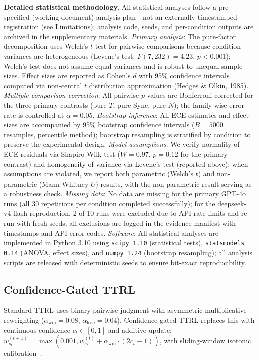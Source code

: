 \documentclass[11pt]{article}
\theoremstyle{definition}
\theoremstyle{remark}
\begin{document}
\textbf{Detailed statistical methodology.} All statistical analyses follow a pre-specified (working-document) analysis plan---not an externally timestamped registration (see Limitations); analysis code, seeds, and per-condition outputs are archived in the supplementary materials. \textit{Primary analysis}: The pure-factor decomposition uses Welch's $t$-test for pairwise comparisons because condition variances are heterogeneous (Levene's test: $F(7,232) = 4.23$, $p < 0.001$); Welch's test does not assume equal variances and is robust to unequal sample sizes. Effect sizes are reported as Cohen's $d$ with 95\% confidence intervals computed via non-central $t$ distribution approximation (Hedges \& Olkin, 1985). \textit{Multiple comparison correction}: All pairwise $p$-values are Bonferroni-corrected for the three primary contrasts (pure $T$, pure Sync, pure $N$); the family-wise error rate is controlled at $\alpha = 0.05$. \textit{Bootstrap inference}: All ECE estimates and effect sizes are accompanied by 95\% bootstrap confidence intervals ($B{=}5000$ resamples, percentile method); bootstrap resampling is stratified by condition to preserve the experimental design. \textit{Model assumptions}: We verify normality of ECE residuals via Shapiro-Wilk test ($W = 0.97$, $p = 0.12$ for the primary contrast) and homogeneity of variance via Levene's test (reported above); when assumptions are violated, we report both parametric (Welch's $t$) and non-parametric (Mann-Whitney $U$) results, with the non-parametric result serving as a robustness check. \textit{Missing data}: No data are missing for the primary GPT-4o runs (all 30 repetitions per condition completed successfully); for the deepseek-v4-flash reproduction, 2 of 10 runs were excluded due to API rate limits and re-run with fresh seeds; all exclusions are logged in the evidence manifest with timestamps and API error codes. \textit{Software}: All statistical analyses are implemented in Python 3.10 using \texttt{scipy 1.10} (statistical tests), \texttt{statsmodels 0.14} (ANOVA, effect sizes), and \texttt{numpy 1.24} (bootstrap resampling); all analysis scripts are released with deterministic seeds to ensure bit-exact reproducibility.

\subsection{Confidence-Gated TTRL}

Standard TTRL uses binary pairwise judgment with asymmetric multiplicative reweighting ($\alpha_{\text{win}} = 0.08$, $\alpha_{\text{lose}} = 0.04$). Confidence-gated TTRL replaces this with continuous confidence $c_t \in [0,1]$ and additive update: $w_{s_t}^{(t+1)} = \max(0.001, w_{s_t}^{(t)} + \alpha_{\text{win}} \cdot (2c_t - 1))$, with sliding-window isotonic calibration~\citep{niculescu2005predicting}.
\end{document}
